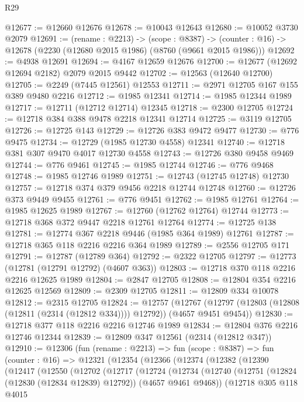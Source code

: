 \begin{lexlean}{R29}
\begin{coremodule}
@12677 := @12660 @12676
@12678 := @10043 @12643
@12680 := @10052 @3730 @2079
@12691 := (rename : @2213) ->
  (scope : @8387) ->
  (counter : @16) -> @12678 (@2230 (@12680 @2015 @1986) (@8760 (@9661 @2015 @1986)))
@12692 := @4938 @12691
@12694 := @4167 @12659 @12676
@12700 := @12677 (@12692 @12694 @2182) @2079 @2015 @9442
@12702 := @12563 (@12640 @12700)
@12705 := @2249 (@7445 @12561) @12553
@12711 := @2971 @12705 @167 @155 @389 @9480 @2216
@12712 := @1985 @12341
@12714 := @1985 @12344 @1989
@12717 := @12711 (@12712 @12714) @12345
@12718 := @2300 @12705
@12724 := @12718 @384 @388 @9478 @2218 @12341 @12714
@12725 := @3119 @12705
@12726 := @12725 @143
@12729 := @12726 @383 @9472 @9477
@12730 := @776 @9475
@12734 := @12729 (@1985 @12730 @4558) @12341
@12740 := @12718 @381 @307 @9470 @4017 @12730 @4558
@12743 := @12726 @380 @9458 @9469
@12744 := @776 @9461
@12745 := @1985 @12744
@12746 := @776 @9468
@12748 := @1985 @12746 @1989
@12751 := @12743 (@12745 @12748) @12730
@12757 := @12718 @374 @379 @9456 @2218 @12744 @12748
@12760 := @12726 @373 @9449 @9455
@12761 := @776 @9451
@12762 := @1985 @12761
@12764 := @1985 @12625 @1989
@12767 := @12760 (@12762 @12764) @12744
@12773 := @12718 @368 @372 @9447 @2218 @12761 @12764
@12774 := @12725 @138
@12781 := @12774 @367 @2218 @9446 (@1985 @364 @1989) @12761
@12787 := @12718 @365 @118 @2216 @2216 @364 @1989
@12789 := @2556 @12705 @171
@12791 := @12787 (@12789 @364)
@12792 := @2322 @12705
@12797 := @12773 (@12781 (@12791 @12792) (@4607 @363))
@12803 := @12718 @370 @118 @2216 @2216 @12625 @1989
@12804 := @2847 @12705
@12808 := @12804 @354 @2216 @12625 @12569
@12809 := @2309 @12705
@12811 := @12809 @334 @10078
@12812 := @2315 @12705
@12824 := @12757
    (@12767 (@12797 (@12803 (@12808 (@12811 (@2314 (@12812 @334)))) @12792)) (@4657 @9451 @9454))
@12830 := @12718 @377 @118 @2216 @2216 @12746 @1989
@12834 := @12804 @376 @2216 @12746 @12344
@12839 := @12809 @347 @12561 (@2314 (@12812 @347))
@12910 := @12306
    (fun (rename : @2213) =>
    fun (scope : @8387) =>
    fun (counter : @16) =>
    @12321
      (@12354
        (@12366
          (@12374
            (@12382
              (@12390
                (@12417
                  (@12550
                    (@12702
                      (@12717
                        (@12724
                          (@12734
                            (@12740
                              (@12751 (@12824 (@12830 (@12834 @12839) @12792)) (@4657 @9461 @9468))
                              (@12718
                                @305
                                @118
                                @4015

\end{coremodule}
\end{lexlean}
